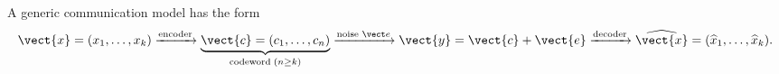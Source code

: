A generic communication model has the form
\[
\vect{x}=(x_1,\dots,x_k)
\xrightarrow{\text{encoder}}
\underbrace{\vect{c}=(c_1,\dots,c_n)}_{\text{codeword}\; (n\geq k)}
\xrightarrow{\text{noise }\vect e}
\vect{y}=\vect{c}+\vect{e}
\xrightarrow{\text{decoder}}
\widehat{\vect{x}}=(\widehat x_1,\dots,\widehat x_k).
\]

\medskip

